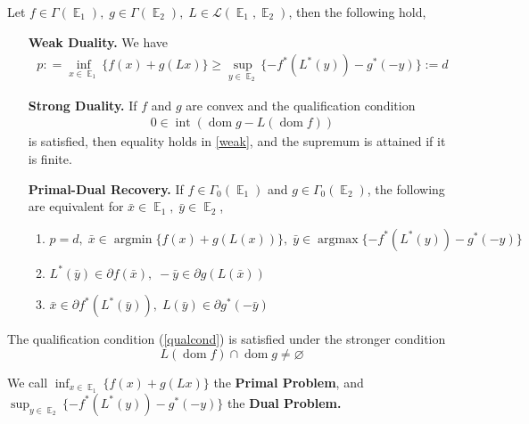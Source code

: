 \documentclass{tufte-handout}
\DeclareMathOperator{\dom}{dom}
\DeclareMathOperator{\argmin}{argmin}
\DeclareMathOperator{\E}{\mathbb{E}}
\begin{document}
{{\begin{theorem} \label{Fenchel-Rock}
  Let $f \in \Gamma(\E_1), \; g \in \Gamma(\E_2), \; L \in \mathcal{L}(\E_1 , \E_2)$, then the following hold, 
  \begin{enumerate}
    \item[\bf Weak Duality.] We have 
    \begin{equation}
      \label{weak}
      \begin{split}
       p: = \inf_{x \in \E_1}\{f(x) + g(Lx) \} \geq \sup_{y \in \E_2}\{- f^* (L^*(y))- g^* (-y)\} := d 
      \end{split}
    \end{equation}
       \item[\bf Strong Duality.] If $f$ and $g$ are convex and the qualification condition
    \begin{equation}
      \label{qualcond}
      \begin{split}
        0 \in \operatorname{int}(\dom g - L(\dom f))
      \end{split}
    \end{equation}
    is satisfied, then equality holds in \ref{weak}, and the supremum is attained if it is finite.
    \item[\bf Primal-Dual Recovery.] If $f \in \Gamma_0(\E_1)$ and $g \in \Gamma_0(\E_2)$, the following are equivalent for $\bar x \in \E_1, \; \bar y \in \E_2$,
    \begin{enumerate}
      \item $p= d, \; \bar x \in \argmin\{f(x) + g(L(x))\}, \; {\bar y \in \operatorname{argmax} \{- f^* (L^* (y)) - g^*(-y)\}}$ 
      \item $L^*(\bar y) \in \partial f(\bar x) ,\; - \bar y \in \partial g(L(\bar x))$
      \item $\bar x \in \partial f^* (L^* (\bar y)), \; L(\bar y )\in \partial g^*(-\bar y)$
    \end{enumerate}
  \end{enumerate}
\end{theorem}
\begin{remark} 
  The qualification condition (\ref{qualcond}) is satisfied under the stronger condition 
  $$L(\dom f) \cap \dom g \neq \varnothing $$
\end{remark}
\begin{remark} 
  We call ${\inf_{x \in \E_1}\{f(x) + g(Lx) \}}$ the \textbf{Primal Problem}, and  ${\sup_{y \in \E_2}\{- f^* (L^*(y))- g^* (-y)\}} $ the \textbf{Dual Problem.} 

\end{remark}}}
\end{document}
